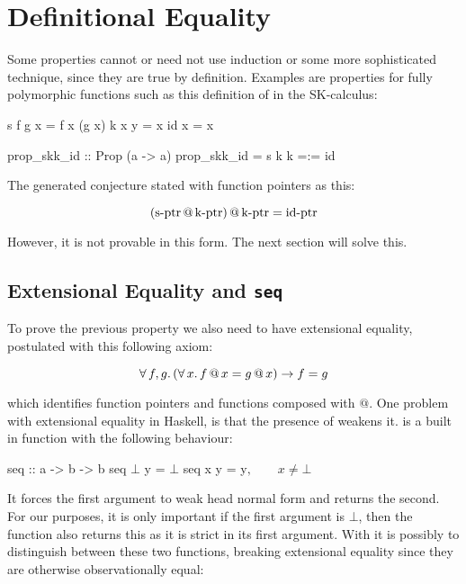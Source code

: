 \section{Definitional Equality}
\label{sec:equality}

Some properties cannot or need not use induction or some more
sophisticated technique, since they are true by definition. Examples
are properties for fully polymorphic functions such as this definition
of  in the SK-calculus:

\begin{code}
s f g x = f x (g x)
k x y = x
id x = x

prop_skk_id :: Prop (a -> a)
prop_skk_id = s k k =:= id
\end{code}

The generated conjecture stated with function pointers as this:

\begin{equation*}
(\mathrm{\operatorname{s-ptr}} \, @ \, \mathrm{\operatorname{k-ptr}} )
     \, @ \, \mathrm{\operatorname{k-ptr}} = \mathrm{\operatorname{id-ptr}}
\end{equation*}

However, it is not provable in this form. The next section will solve this.

\subsection{Extensional Equality and \texttt{seq}}

To prove the previous property we also need to have extensional
equality, postulated with this following axiom:

\begin{equation*}
\forall \, f , g . \, (\forall \, x . \, f \, @ \, x = g \, @ \, x) \rightarrow f = g
\end{equation*}

\noindent
which identifies function pointers and functions composed with $@$.
One problem with extensional equality in Haskell, is that the presence
of  weakens it.  is a built in function with the
following behaviour:

\begin{code}[mathescape]
seq :: a -> b -> b
seq $\bot$ y = $\bot$
seq x y = y$, \qquad x \neq \bot$
\end{code}

It forces the first argument to weak head normal form and returns the
second. For our purposes, it is only important if the first argument
is $\bot$, then the function also returns this as it is strict in its
first argument. With  it is possibly to distinguish between
these two functions, breaking extensional equality since they are
otherwise observationally equal:

